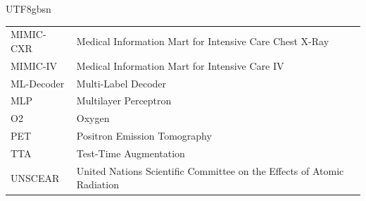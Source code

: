 \documentclass[13pt]{extarticle}
\begin{document}
\begin{CJK*}{UTF8}{gbsn}
\begin{table}[H]
\begin{tabular}{ll}
        MIMIC-CXR & Medical Information Mart for Intensive Care Chest X-Ray \\
        MIMIC-IV & Medical Information Mart for Intensive Care IV \\
        ML-Decoder & Multi-Label Decoder \\
        MLP & Multilayer Perceptron \\
        O2 & Oxygen \\
        PET & Positron Emission Tomography \\
        TTA & Test-Time Augmentation \\
        UNSCEAR & United Nations Scientific Committee on the Effects of Atomic Radiation \\

    \end{tabular}
\end{table}\newpage
\tableofcontents
\newpage

{}
\listoffigures
\newpage

{}
\listoftables
\newpage









\newpage



\newpage
\appendix


\end{CJK*}
\end{document}
